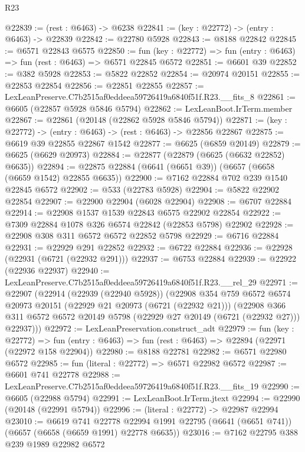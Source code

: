 \begin{lexlean}{R23}
\begin{coremodule}
@22839 := (rest : @6463) -> @6238
@22841 := (key : @22772) -> (entry : @6463) -> @22839
@22842 := @22780 @5928
@22843 := @8188 @22842
@22845 := @6571 @22843 @6575
@22850 := fun (key : @22772) => fun (entry : @6463) => fun (rest : @6463) => @6571 @22845 @6572
@22851 := @6601 @39
@22852 := @382 @5928
@22853 := @5822 @22852
@22854 := @20974 @20151
@22855 := @22853 @22854
@22856 := @22851 @22855
@22857 := LexLeanPreserve.C7b2515af0eddeea59726419a6840f51f.R23.__fits_8
@22861 := @6605 (@22857 @5928 @5846 @5794)
@22862 := LexLeanBoot.IrTerm.member
@22867 := @22861 (@20148 (@22862 @5928 @5846 @5794))
@22871 := (key : @22772) -> (entry : @6463) -> (rest : @6463) -> @22856 @22867
@22875 := @6619 @39 @22855 @22867 @1542
@22877 := @6625 (@6859 @20149)
@22879 := @6625 (@6629 @20973)
@22884 := @22877 (@22879 (@6625 (@6632 @22852) @6635))
@22894 := @22875 @22884 (@6641 (@6651 @39)) (@6657 (@6658 (@6659 @1542) @22855 @6635))
@22900 := @7162 @22884 @702 @239 @1540 @22845 @6572
@22902 := @533 (@22783 @5928)
@22904 := @5822 @22902 @22854
@22907 := @22900 @22904 (@6028 @22904)
@22908 := @6707 @22884
@22914 := @22908 @1537 @1539 @22843 @6575 @22902 @22854
@22922 := @7309 @22884 @1078 @326 @6574 @22842 (@22853 @5798) @22902
@22928 := @22908 @308 @311 @6572 @6572 @22852 @5798
@22929 := @6716 @22884
@22931 := @22929 @291 @22852
@22932 := @6722 @22884
@22936 := @22928 (@22931 (@6721 (@22932 @291)))
@22937 := @6753 @22884
@22939 := @22922 (@22936 @22937)
@22940 := LexLeanPreserve.C7b2515af0eddeea59726419a6840f51f.R23.__rel_29
@22971 := @22907
    (@22914
      (@22939 (@22940 @5928))
      (@22908
        @354
        @759
        @6572
        @6574
        @20973
        @20151
        (@22929 @21 @20973 (@6721 (@22932 @21)))
        (@22908
          @366
          @311
          @6572
          @6572
          @20149
          @5798
          (@22929 @27 @20149 (@6721 (@22932 @27)))
          @22937)))
@22972 := LexLeanPreservation.construct_adt
@22979 := fun (key : @22772) =>
  fun (entry : @6463) => fun (rest : @6463) => @22894 (@22971 (@22972 @158 @22904))
@22980 := @8188 @22781
@22982 := @6571 @22980 @6572
@22985 := fun (literal : @22772) => @6571 @22982 @6572
@22987 := @6601 @741 @22778
@22988 := LexLeanPreserve.C7b2515af0eddeea59726419a6840f51f.R23.__fits_19
@22990 := @6605 (@22988 @5794)
@22991 := LexLeanBoot.IrTerm.jtext
@22994 := @22990 (@20148 (@22991 @5794))
@22996 := (literal : @22772) -> @22987 @22994
@23010 := @6619
    @741
    @22778
    @22994
    @1991
    @22795
    (@6641 (@6651 @741))
    (@6657 (@6658 (@6659 @1991) @22778 @6635))
@23016 := @7162 @22795 @388 @239 @1989 @22982 @6572

\end{coremodule}
\end{lexlean}
